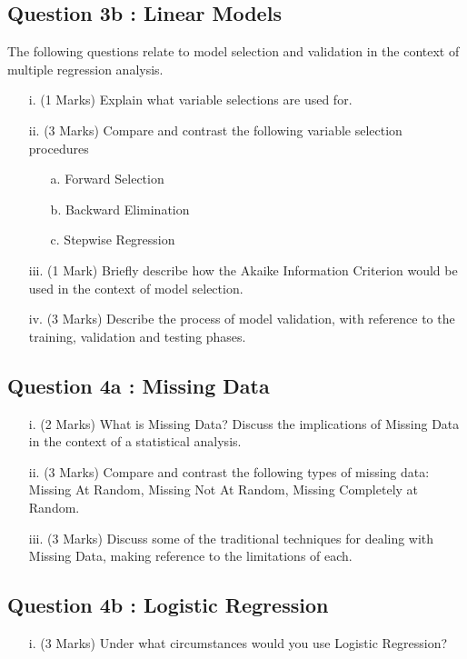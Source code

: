 \documentclass[a4paper,12pt]{article}
\begin{document}
\subsection*{Question 3b : Linear Models} %
The following questions relate to model selection and validation in the context of multiple
regression analysis.
\begin{itemize}
\item[i.](1 Marks) Explain what variable selections are used for.
\item[ii.](3 Marks) Compare and contrast the following variable selection procedures
\begin{itemize}
    \item[a.] Forward Selection
    \item[b.] Backward Elimination
    \item[c.] Stepwise Regression
    \end{itemize}
\item[iii.](1 Mark) Briefly describe how the Akaike Information Criterion would be used in the context of model selection.
\item[iv.](3 Marks) Describe the process of model validation, with reference to the training, validation and testing phases.
\end{itemize}

\newpage

\subsection*{Question 4a : Missing Data}%
\begin{itemize}
\item[i.](2 Marks) What is Missing Data? Discuss the implications of Missing Data in the context of a statistical analysis.
\item[ii.](3 Marks) Compare and contrast the following types of missing data: Missing At Random, Missing Not At Random, Missing Completely at Random.
\item[iii.](3 Marks) Discuss some of the traditional techniques for dealing with Missing Data, making reference to the limitations of each.
\end{itemize}

\subsection*{Question 4b : Logistic Regression} %
\begin{itemize}
\item[i.](3 Marks) Under what circumstances would you use Logistic Regression?
\end{itemize}
\end{document}
